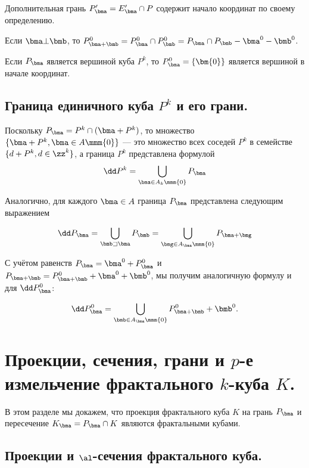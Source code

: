 Дополнительная грань $P'_\bma=E'_\bma\cap P$ содержит начало координат по своему определению.

Если $\bma\bot\bmb$, то $P^0_{\bma+\bmb}=P^0_\bma\cap P^0_\bmb=P_\bma\cap P_\bmb-\bma^0-\bmb^0$.

Если $P_\bma$ является вершиной куба $P^k$, то $P^0_\bma=\{\bm{0}\}$ является вершиной в начале координат.
 
 
\subsection {Граница единичного куба $P^k$ и его грани.} 

Поскольку $P_\bma=P^k\cap(\bma+P^k)$, то множество
$\{\bma+P^k, \bma\in A\mmm \{0\}\}$ --- это множество всех соседей $P ^ k$ в семействе $\{d+P^k, d\in\zz^k\}$, а граница $P^k$ представлена формулой 
\begin{equation}\label{dpk}
\dd P^k=\bigcup\limits_{\bma\in A_k\mmm \{0\}}P_\bma
\end{equation}
 
Аналогично, для каждого $\bma\in A$ граница $P_\bma$ представлена следующим выражением
 
\begin{equation}\label{dpal}
    \dd P_\bma= \bigcup\limits_{\bmb\sqsupset\bma}P_{\bmb}=\bigcup\limits_{\bmg\in A_\bma\mmm\{0\}}P_{\bma+\bmg}
\end{equation}

С учётом равенств $P_\bma=\bma^0+P^0_{\bma}$ и $P_{\bma+\bmb}= P^0_{\bma+\bmb}+\bma^0+\bmb^0$, мы получим аналогичную формулу и для $\dd P^0_\bma$:

\begin{equation}\label{dpa0}
    \dd P^0_\bma=\bigcup\limits_{\bmb\in A_\bma\mmm\{0\}}P^0_{\bma+\bmb}+\bmb^0.
\end{equation}


\section{Проекции, сечения, грани и $p$-е измельчение фрактального $k$-куба $K$.}

В этом разделе мы докажем, что проекция фрактального куба $K$ на грань $P_\bma$ и пересечение $K_\bma=P_\bma\cap K$ являются фрактальными кубами.

\subsection{Проекции и $\al$-сечения фрактального куба.}


